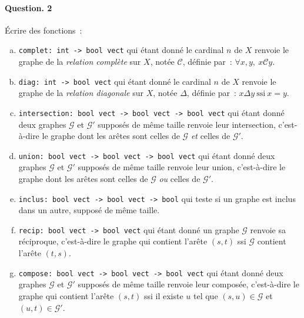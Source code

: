 \documentclass[10pt,a4paper]{article}
\begin{document}
\paragraph{Question. 2\\}
Écrire des fonctions~:
\begin{enumerate}[a)]
\item \texttt{complet: int -> bool vect} qui étant donné le cardinal $n$ de $X$
renvoie le graphe de la \textit{relation complète} sur $X$, notée $\mathcal{C}$,
définie par~: $\forall x, y, \ x \mathcal{C} y$.
\item \texttt{diag: int -> bool vect} qui étant donné le cardinal $n$ de $X$
renvoie le graphe de la \textit{relation diagonale} sur $X$, notée $\Delta$, 
définie par~: $x \Delta y \ \mathrm{ssi} \ x=y$.
\item \texttt{intersection: bool vect -> bool vect -> bool vect} qui étant donné
deux graphes $\mathcal{G}$ et $\mathcal{G'}$ supposés de même taille renvoie leur 
intersection, c'est-à-dire le graphe dont les arêtes sont celles de $\mathcal{G}$ 
\textit{et} celles de $\mathcal{G'}$.
\item \texttt{union: bool vect -> bool vect -> bool vect} qui étant donné
deux graphes $\mathcal{G}$ et $\mathcal{G'}$ supposés de même taille renvoie leur 
union, c'est-à-dire le graphe dont les arêtes sont celles de $\mathcal{G}$ 
\textit{ou} celles de $\mathcal{G'}$.
\item \texttt{inclus: bool vect -> bool vect -> bool} qui teste si un graphe
est inclus dans un autre, supposé de même taille.
\item \texttt{recip: bool vect -> bool vect} qui étant donné un graphe 
$\mathcal{G}$ renvoie sa réciproque, c'est-à-dire le graphe qui contient l'arête 
$(s,t)$ ssi $\mathcal{G}$ contient l'arête $(t,s)$.
\item \texttt{compose: bool vect -> bool vect -> bool vect} qui étant donné 
deux graphes $\mathcal{G}$ et $\mathcal{G'}$ supposés de même taille renvoie leur 
composée, c'est-à-dire le graphe qui contient l'arête $(s,t)$ ssi il existe 
$u$ tel que $(s,u)\in \mathcal{G}$ et $(u,t) \in \mathcal{G'}$.
\end{enumerate}
\end{document}
